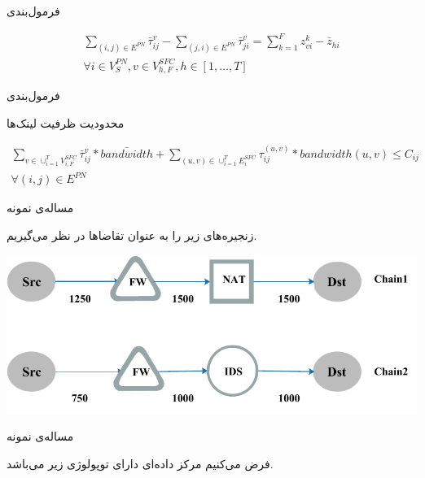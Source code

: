 \documentclass{beamer}
\begin{document}
\begin{persian}
\begin{frame}{فرمول‌بندی}
\begin{latin}
\begin{align}
        \sum_{(i,j) \in E^{PN}} \bar{\tau}_{ij}^{v} - \sum_{(j,i) \in E^{PN}} \bar{\tau}_{ji}^{v} = \sum_{k=1}^{F} z_{vi}^{k} - \bar{z}_{hi} \nonumber \\
        \forall i \in V_{S}^{PN}, v \in V_{h, F}^{SFC}, h \in [1,\ldots, T]
    \end{align}\end{latin}
\end{frame}
\begin{frame}{فرمول‌بندی}
    \par
    محدودیت ظرفیت لینک‌ها
    \begin{latin}\begin{align}
        \sum_{v \in \cup_{i=1}^{T} V_{i,F}^{SFC}} \bar{\tau}_{ij}^{v} * \bar{bandwidth} + \sum_{(u,v) \in \cup_{i=1}^{T} E_{i}^{SFC}} \tau_{ij}^{(u,v)} * bandwidth(u,v) \le C_{ij} \nonumber \\
        \forall (i, j) \in E^{PN}
    \end{align}\end{latin}
\end{frame}
\begin{frame}{مساله‌ی نمونه}
    \par
    زنجیره‌های زیر را به عنوان تقاضاها در نظر می‌گیریم.

    \begin{center}
        \includegraphics[scale=0.5]{./images/chains.pdf}
    \end{center}
\end{frame}
\begin{frame}{مساله‌ی نمونه}
    \par
    فرض می‌کنیم مرکز داده‌ای دارای توپولوژی زیر می‌باشد.


\end{frame}
\end{persian}
\end{document}
